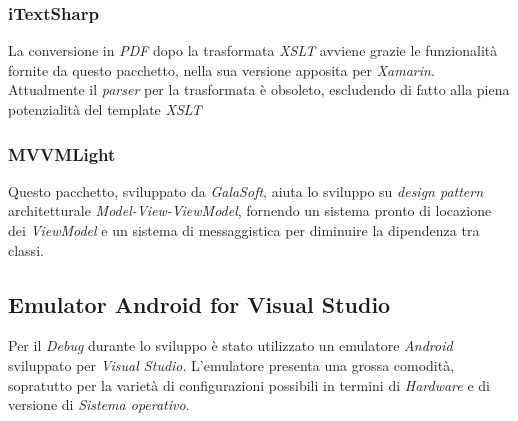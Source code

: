 \subsubsection{iTextSharp}
La conversione in \textit{PDF} dopo la trasformata \textit{XSLT} avviene grazie le funzionalità fornite da questo pacchetto, nella sua versione apposita per \textit{Xamarin}. Attualmente il \textit{parser} per la trasformata è obsoleto, escludendo di fatto alla piena potenzialità del template \textit{XSLT}

\subsubsection{MVVMLight}
Questo pacchetto, sviluppato da \textit{GalaSoft}, aiuta lo sviluppo su \textit{design pattern} architetturale \textit{Model-View-ViewModel}, fornendo un sistema pronto di locazione dei \textit{ViewModel} e un sistema di messaggistica per diminuire la dipendenza tra classi.

\subsection{Emulator Android for Visual Studio}
Per il \textit{Debug} durante lo sviluppo è stato utilizzato un emulatore \textit{Android} sviluppato per \textit{Visual Studio}. L'emulatore presenta una grossa comodità, sopratutto per la varietà di configurazioni possibili in termini di \textit{Hardware} e di versione di \textit{Sistema operativo}.


